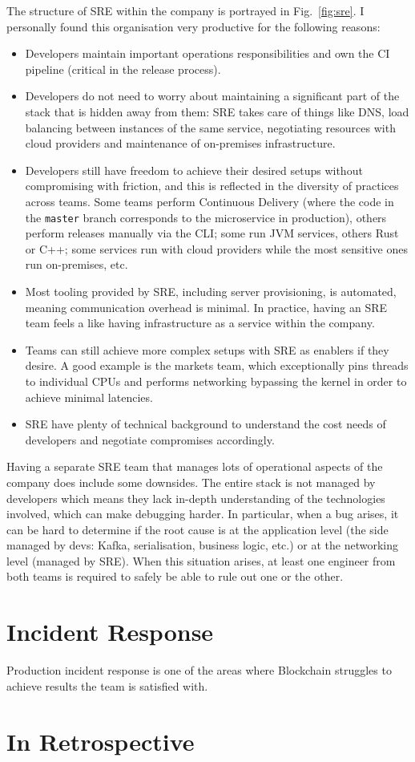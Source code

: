 \documentclass[conference]{IEEEtran}
\begin{document}
    The structure of SRE within the company is portrayed in Fig.~\ref{fig:sre}.
    I personally found this organisation very productive for the following reasons:
    \begin{itemize}
        \item Developers maintain important operations responsibilities and own the CI pipeline (critical in the release process).
        \item Developers do not need to worry about maintaining a significant part of the stack that is hidden away from them: SRE takes care of things like DNS, load balancing between instances of the same service, negotiating resources with cloud providers and maintenance of on-premises infrastructure.
        \item Developers still have freedom to achieve their desired setups without compromising with friction, and this is reflected in the diversity of practices across teams.
        Some teams perform Continuous Delivery (where the code in the \texttt{master} branch corresponds to the microservice in production), others perform releases manually via the CLI; some run JVM services, others Rust or C++;
        some services run with cloud providers while the most sensitive ones run on-premises, etc.
        \item Most tooling provided by SRE, including server provisioning, is automated, meaning communication overhead is minimal.
        In practice, having an SRE team feels a like having infrastructure as a service within the company.
        \item Teams can still achieve more complex setups with SRE as enablers
        if they desire.
        A good example is the markets team, which exceptionally pins threads to individual CPUs and performs networking bypassing the kernel in order to achieve minimal latencies.
        \item SRE have plenty of technical background to understand the cost needs of developers and negotiate compromises accordingly.
    \end{itemize}

    Having a separate SRE team that manages lots of operational aspects of the company does include some downsides.
    The entire stack is not managed by developers which means they lack in-depth understanding of the technologies involved, which can make debugging harder.
    In particular, when a bug arises, it can be hard to determine if the root cause is at the application level (the side managed by devs: Kafka, serialisation, business logic, etc.) or at the networking level (managed by SRE).
    When this situation arises, at least one engineer from both teams is required to safely be able to rule out one or the other.

    \section{Incident Response}\label{sec:incident-response}

    Production incident response is one of the areas where Blockchain struggles to achieve results the team is satisfied with.

    


    \section{In Retrospective}

    \printbibliography
\end{document}

